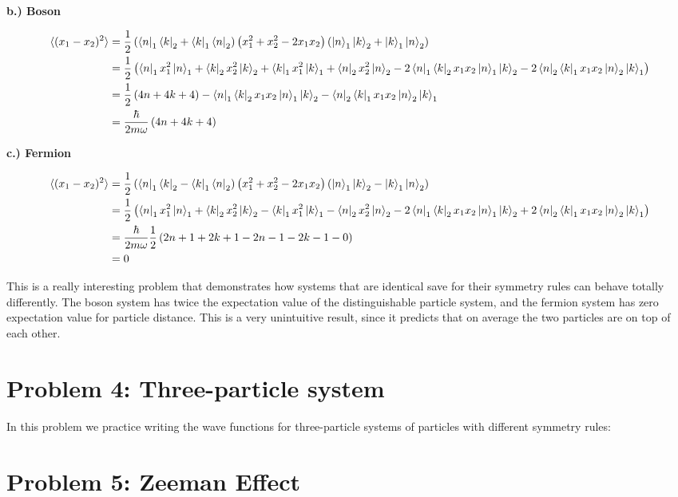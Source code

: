 \documentclass[10pt]{article} %
\begin{document}
\textbf{b.) Boson}

\begin{align*}
  \braket{(x_1-x_2)^2} &=
  \frac{1}{2}\left(\bra{n}_1\bra{k}_2 + \bra{k}_1\bra{n}_2\right)
  \left(x_1^2 + x_2^2 - 2x_1x_2\right)
  \left(\ket{n}_1\ket{k}_2 + \ket{k}_1\ket{n}_2\right)\\
  &= \frac{1}{2}\left(
  \bra{n}_1x_1^2\ket{n}_1 + \bra{k}_2x_2^2\ket{k}_2
  + \bra{k}_1x_1^2\ket{k}_1 + \bra{n}_2x_2^2\ket{n}_2
  - 2\bra{n}_1\bra{k}_2x_1x_2\ket{n}_1\ket{k}_2 - 2\bra{n}_2\bra{k}_1x_1x_2\ket{n}_2\ket{k}_1\right)\\
  &= \frac{1}{2}\left(4n + 4k + 4\right)
  - \bra{n}_1\bra{k}_2x_1x_2\ket{n}_1\ket{k}_2 - \bra{n}_2\bra{k}_1x_1x_2\ket{n}_2\ket{k}_1\\
  &= \frac{\hbar}{2m\omega}\left(4n + 4k + 4\right)\\
\end{align*}

\textbf{c.) Fermion}

\begin{align*}
  \braket{(x_1-x_2)^2} &=
  \frac{1}{2}\left(\bra{n}_1\bra{k}_2 - \bra{k}_1\bra{n}_2\right)
  \left(x_1^2 + x_2^2 - 2x_1x_2\right)
  \left(\ket{n}_1\ket{k}_2 - \ket{k}_1\ket{n}_2\right)\\
  &= \frac{1}{2}\left(
  \bra{n}_1x_1^2\ket{n}_1 + \bra{k}_2x_2^2\ket{k}_2
  - \bra{k}_1x_1^2\ket{k}_1 - \bra{n}_2x_2^2\ket{n}_2
  - 2\bra{n}_1\bra{k}_2x_1x_2\ket{n}_1\ket{k}_2 + 2\bra{n}_2\bra{k}_1x_1x_2\ket{n}_2\ket{k}_1\right)\\
  &= \frac{\hbar}{2m\omega}\frac{1}{2}\left(2n+1 + 2k+1 - 2n-1 - 2k-1 - 0\right)\\
  &= 0\\
\end{align*}

This is a really interesting problem that demonstrates how systems that are identical save
for their symmetry rules can behave totally differently. The boson system has twice the expectation
value of the distinguishable particle system, and the fermion system has zero expectation value
for particle distance. This is a very unintuitive result, since it predicts that on average the
two particles are on top of each other.\\

\section{Problem 4: Three-particle system}
In this problem we practice writing the wave functions for three-particle systems of particles
with different symmetry rules:\\

\section{Problem 5: Zeeman Effect}
\end{document}
